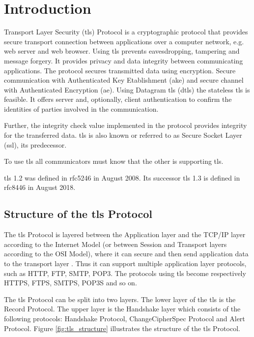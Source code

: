 \chapter{Introduction}
\label{chap:introduction}
Transport Layer Security (\gls{tls}) Protocol is a cryptographic protocol that provides secure transport connection between applications over a computer network, e.g. web server and web browser. 
Using \gls{tls} prevents eavesdropping, tampering and message forgery. It provides privacy and data integrity between communicating applications. The protocol secures transmitted data using encryption. Secure communication with Authenticated Key Etablishment (\gls{ake}) and secure channel with Authenticated Encryption (\gls{ae}). 
Using Datagram \gls{tls} (\gls{dtls}) the stateless \gls{tls} is feasible. It offers server and, optionally, client authentication to confirm the identities of parties involved in the communication. 
 
Further, the integrity check value implemented in the protocol provides integrity for the transferred data. \gls{tls} is also known or referred to as Secure Socket Layer (\gls{ssl}), its predecessor. 
 
To use \gls{tls} all communicators must know that the other is supporting \gls{tls}.

\gls{tls} 1.2 was defined in \gls{rfc}5246 in August 2008. Its successor \gls{tls} 1.3 is defined in \gls{rfc}8446 in August 2018.
 \cite{RFC5246}\cite{ms:overview}

\section{Structure of the \gls{tls} Protocol}
\label{sec:stucture}

The \gls{tls} Protocol is layered between the Application layer and the TCP/IP layer according to the Internet Model (or between Session and Transport layers according to the OSI Model), where it can secure and then send application data to the transport layer \cite{ms:overview}. Thus it can support multiple application layer protocols, such as HTTP, FTP, SMTP, POP3. The protocols using \gls{tls} become respectively HTTPS, FTPS, SMTPS, POP3S and so on.

The \gls{tls} Protocol can be split into two layers. The lower layer of the \gls{tls} is the Record Protocol. The upper layer is the Handshake layer which consists of the following protocols: Handshake Protocol, ChangeCipherSpec Protocol and Alert Protocol. Figure \ref{fig:tls_structure} illustrates the structure of the \gls{tls} Protocol. 
\cite{tlsstrukt}

